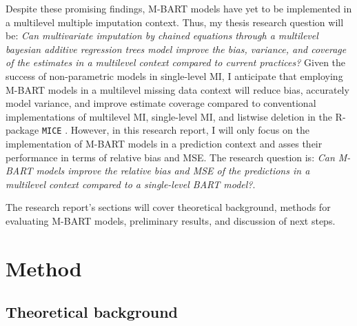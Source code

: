 \documentclass[10pt, a4paper, titlepage]{article}
\begin{document}
Despite these promising findings, M-BART models have yet to be implemented in a multilevel multiple imputation context. Thus, my thesis research question will be: \textit{Can multivariate imputation by chained equations through a multilevel bayesian additive regression trees model improve the bias, variance, and coverage of the estimates in a multilevel context compared to current practices?} Given the success of non-parametric models in single-level MI, I anticipate that employing M-BART models in a multilevel missing data context will reduce bias, accurately model variance, and improve estimate coverage compared to conventional implementations of multilevel MI, single-level MI, and listwise deletion in the R-package \texttt{MICE} \citep{buuren2011}. However, in this research report, I will only focus on the implementation of M-BART models in a prediction context and asses their performance in terms of relative bias and MSE. The research question is: \textit{Can M-BART models improve the relative bias and MSE of the predictions in a multilevel context compared to a single-level BART model?}.

The research report's sections will cover theoretical background, methods for evaluating M-BART models, preliminary results, and discussion of next steps.

\section{Method}
\subsection{Theoretical background}
\end{document}
